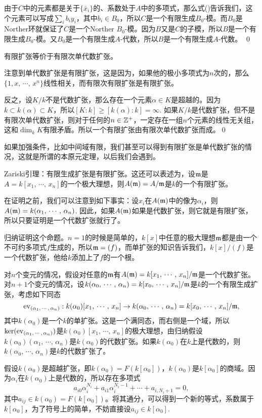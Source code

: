 	由于$C$中的元素都是关于$\{\bar{x}_i\}$的、系数处于$A$中的多项式，那么式(\theequation)告诉我们，这个元素可以写成$\sum_i b_i y_i$，其中$b_i\in B_0$，所以$C$是一个有限生成$B_0$-模。而$B_0$是Norther环就保证了$C$是一个Norther $B_0$-模。因为$B$又是$C$的子模，所以$B$是一个有限生成$B_0$-模。又$B_0$是一个有限生成$A$-代数，所以$B$是一个有限生成$A$-代数。
\qed

\pro 有限扩张等价于有限次单代数扩张。

\proof 注意到单代数扩张是有限扩张，这是因为，如果他的极小多项式为$n$次的，那么$\{1,x,\,\cdots,\,x^n\}$线性相关，而有限次有限扩张是有限扩张。

反之，设$K/k$不是代数扩张，那么存在一个元素$\alpha\in K$是超越的。因为$k\subset k(\alpha)\subset K$，所以$[K:k]\geq [k(\alpha):k]=\infty$. 如果$K/k$是代数扩张，但不是有限次单代数扩张，则对于任何的$n\in \mathbb{Z}^+$，一定存在一组$n$个元素的线性无关组，这和$\dim_k K$有限矛盾。所以一个有限扩张由有限次单代数扩张而成。\qed

如果加强条件，比如中间域有限，我们甚至可以得到有限扩张是单代数扩张的情况，这就是所谓的本原元定理，以后我们会遇到。

\lem Zariski引理：有限生成扩张是有限扩张。这还可以表述为，设$\mathfrak{m}$是$A=k[x_1,\,\cdots,\,x_n]$的一个极大理想，则$A(\mathfrak{m})=A/\mathfrak{m}$是$k$的一个有限扩张。

在证明之前，我们可以注意到如下事实：设$x_i$在$A(\mathfrak{m})$中的像为$\alpha_i$，则$A(\mathfrak{m})=k(\alpha_1,\,\cdots,\,\alpha_n)$. 因此，如果$A(\mathfrak{m})$如果是代数扩张，则它就是有限扩张，所以只要证明是一个代数扩张就行了。

\proof 
	归纳证明这个命题。$n=1$的时候是简单的，$k[x]$中任意的极大理想$\mathfrak{m}$都是由一个不可约多项式$f$生成的，所以$\mathfrak{m}=(f)$，而单扩张的知识告诉我们，$k[x]/(f)$是一个代数扩张，他给$k$添加上了$f$的一个根。

	对$n$个变元的情况，假设对任意的$\mathfrak{m}$有$A(\mathfrak{m})=k[x_1,\,\cdots,\,x_n]/\mathfrak{m}$是一个代数扩张。对$n+1$个变元的情况，设$k(\alpha_0,\,\cdots,\,\alpha_{n})=k[x_0,\,\cdots,\,x_n]/\mathfrak{m}$是$k$的一个有限生成扩张，考虑如下同态
	\[
		\operatorname{ev}_{(\alpha_1,\,\cdots,\,\alpha_n)}:k(\alpha_0)[x_1,\,\cdots,\,x_{n}]\to k(\alpha_0,\,\cdots,\,\alpha_{n})=k[x_0,\,\cdots,\,x_n]/\mathfrak{m},
	\]
	其中$k(\alpha_0)$是一个$k$的单扩张。这是一个满同态，而右侧是一个域，所以$\ker(\operatorname{ev}_{(\alpha_1,\,\cdots,\,\alpha_n)})$是$k(\alpha_0)[x_1,\,\cdots,\,x_{n}]$的极大理想，由归纳假设$k(\alpha_0)(\alpha_1,\,\cdots,\,\alpha_{n})$是$k(\alpha_0)$的代数扩张。如果$k(\alpha_0)$在$k$上是代数的，则$k(\alpha_0,\,\cdots,\,\alpha_{n})$是$k$的代数扩张了。

	假设$k(\alpha_0)$是超越扩张，即$k(\alpha_0)=F(k[\alpha_0])$，$k(\alpha_0)$是$k[\alpha_0]$的商域。因为$\alpha_i$在$k(\alpha_0)$上是代数的，所以存在多项式
	\[
		a_{i0}\alpha_i^{N_i}+a_{i1}\alpha_i^{N_i-1}+\cdots +a_{i,N_i+1}=0,
	\]
	其中$a_{ij}\in k(\alpha_0)=F(k[\alpha_0])$。将其通分，可以得到一个新的等式，系数属于$k[\alpha_0]$，为了符号上的简单，不妨直接设$a_{ij}\in k[\alpha_0]$.


